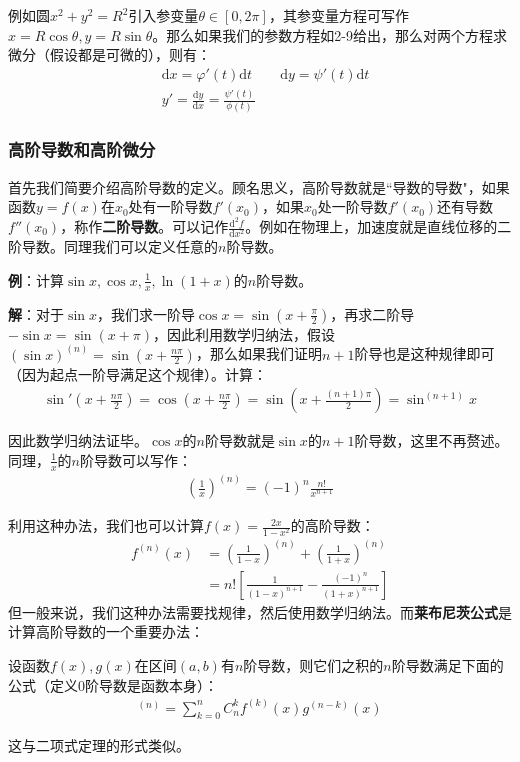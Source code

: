 \documentclass{ctexart}
\let\oldtextbf\textbf %
\renewcommand{\textbf}[1]{\textcolor{btex}{\oldtextbf{#1}}} %
\begin{document}
例如圆$x^2+y^2=R^2$引入参变量$\theta\in[0,2\pi]$，其参变量方程可写作$x=R\cos\theta,y=R\sin\theta$。那么如果我们的参数方程如2-9给出，那么对两个方程求微分（假设都是可微的），则有：
\begin{align*}
    &\mathrm{d}x=\varphi'(t)\mathrm{d}t\qquad \mathrm{d}y=\psi'(t)\mathrm{d}t\\
    &y'=\frac{\mathrm{d}y}{\mathrm{d}x}=\frac{\psi'(t)}{\phi(t)}\tag{2-10}
\end{align*}

\subsubsection{高阶导数和高阶微分}
首先我们简要介绍高阶导数的定义。顾名思义，高阶导数就是“导数的导数"，如果函数$y=f(x)$在$x_0$处有一阶导数$f'(x_0)$，如果$x_0$处一阶导数$f'(x_0)$还有导数$f''(x_0)$，称作\textbf{二阶导数}。可以记作$\frac{\mathrm{d}^2 f}{\mathrm{d}x^2}$。例如在物理上，加速度就是直线位移的二阶导数。同理我们可以定义任意的$n$阶导数。

\textbf{例}：计算$\sin x,\cos x,\frac{1}{x},\ln(1+x)$的$n$阶导数。

\textbf{解}：对于$\sin x$，我们求一阶导$\cos x=\sin(x+\frac{\pi}{2})$，再求二阶导$-\sin x=\sin(x+\pi)$，因此利用数学归纳法，假设$(\sin x)^{(n)}=\sin(x+\frac{n\pi }{2})$，那么如果我们证明$n+1$阶导也是这种规律即可（因为起点一阶导满足这个规律）。计算：
\begin{align*}
    \sin'(x+\frac{n\pi}{2})=\cos(x+\frac{n\pi}{2})=\sin(x+\frac{(n+1)\pi}{2})=\sin^{(n+1)}x
\end{align*}

因此数学归纳法证毕。$\cos x$的$n$阶导数就是$\sin x$的$n+1$阶导数，这里不再赘述。同理，$\frac{1}{x}$的$n$阶导数可以写作：
\begin{align*}
    (\frac{1}{x})^{(n)}=(-1)^n\frac{n!}{x^{n+1}}
\end{align*}

利用这种办法，我们也可以计算$f(x)=\frac{2x}{1-x^2}$的高阶导数：
\begin{align*}
    f^{(n)}(x)&=(\frac{1}{1-x})^{(n)}+(\frac{1}{1+x})^{(n)}\\
    &=n!\left[\frac{1}{(1-x)^{n+1}}-\frac{(-1)^n}{(1+x)^{n+1}}\right]
\end{align*}
但一般来说，我们这种办法需要找规律，然后使用数学归纳法。而\textbf{莱布尼茨公式}是计算高阶导数的一个重要办法：
\begin{tcolorbox}[
    colback=bac1,     %
    colframe=fra1,   %
    coltitle=white,             %
    coltext=tex1,
    title=Leibniz公式,
    fonttitle=\bfseries,        %
arc=3mm,                     %
breakable
]
设函数$f(x),g(x)$在区间$(a,b)$有$n$阶导数，则它们之积的$n$阶导数满足下面的公式（定义0阶导数是函数本身）：
\begin{align*}
    [f(x)g(x)]^{(n)}=\sum_{k=0}^n C_n^kf^{(k)}(x)g^{(n-k)}(x)\tag{2-11}
\end{align*}

这与二项式定理的形式类似。
\end{tcolorbox}
\end{document}
